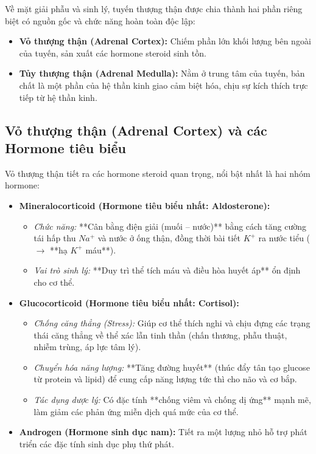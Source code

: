 Về mặt giải phẫu và sinh lý, tuyến thượng thận được chia thành hai phần riêng biệt có nguồn gốc và chức năng hoàn toàn độc lập:
\begin{itemize}
    \item \textbf{Vỏ thượng thận (Adrenal Cortex):} Chiếm phần lớn khối lượng bên ngoài của tuyến, sản xuất các hormone steroid sinh tồn.
    \item \textbf{Tủy thượng thận (Adrenal Medulla):} Nằm ở trung tâm của tuyến, bản chất là một phần của hệ thần kinh giao cảm biệt hóa, chịu sự kích thích trực tiếp từ hệ thần kinh.
\end{itemize}

\subsection{Vỏ thượng thận (Adrenal Cortex) và các Hormone tiêu biểu}

Vỏ thượng thận tiết ra các hormone steroid quan trọng, nổi bật nhất là hai nhóm hormone:

\begin{itemize}
    \item \textbf{Mineralocorticoid (Hormone tiêu biểu nhất: Aldosterone):}
    \begin{itemize}
        \item \textit{Chức năng:} **Cân bằng điện giải (muối -- nước)** bằng cách tăng cường tái hấp thu $Na^+$ và nước ở ống thận, đồng thời bài tiết $K^+$ ra nước tiểu ($\rightarrow$ **hạ $K^+$ máu**).
        \item \textit{Vai trò sinh lý:} **Duy trì thể tích máu và điều hòa huyết áp** ổn định cho cơ thể.
    \end{itemize}

    \item \textbf{Glucocorticoid (Hormone tiêu biểu nhất: Cortisol):}
    \begin{itemize}
        \item \textit{Chống căng thẳng (Stress):} Giúp cơ thể thích nghi và chịu đựng các trạng thái căng thẳng về thể xác lẫn tinh thần (chấn thương, phẫu thuật, nhiễm trùng, áp lực tâm lý).
        \item \textit{Chuyển hóa năng lượng:} **Tăng đường huyết** (thúc đẩy tân tạo glucose từ protein và lipid) để cung cấp năng lượng tức thì cho não và cơ bắp.
        \item \textit{Tác dụng dược lý:} Có đặc tính **chống viêm và chống dị ứng** mạnh mẽ, làm giảm các phản ứng miễn dịch quá mức của cơ thể.
    \end{itemize}

    \item \textbf{Androgen (Hormone sinh dục nam):} Tiết ra một lượng nhỏ hỗ trợ phát triển các đặc tính sinh dục phụ thứ phát.
\end{itemize}


